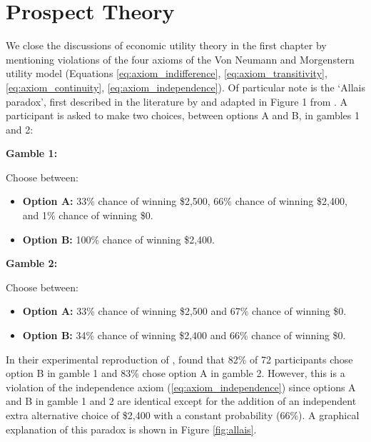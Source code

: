 \section{Prospect Theory}\label{sec:prospect}

We close the discussions of economic utility theory in the first chapter by mentioning violations of the four axioms of the Von Neumann and Morgenstern utility model (Equations \ref{eq:axiom_indifference}, \ref{eq:axiom_transitivity}, \ref{eq:axiom_continuity}, \ref{eq:axiom_independence}). Of particular note is the ‘Allais paradox’, first described in the literature by \cite{allaisComportementLHommeRationnel1953} and adapted in Figure 1 from \cite{kahnemanProspectTheoryAnalysis1979}. A participant is asked to make two choices, between options A and B, in gambles 1 and 2:

\begin{center}
\textbf{Gamble 1:}
\end{center}

Choose between:
\begin{itemize}
    \item \textbf{Option A:} 33\% chance of winning \$2,500, 66\% chance of winning \$2,400, and 1\% chance of winning \$0.
    \item \textbf{Option B:} 100\% chance of winning \$2,400.
\end{itemize}

\begin{center}
\textbf{Gamble 2:}
\end{center}

Choose between:
\begin{itemize}
    \item \textbf{Option A:} 33\% chance of winning \$2,500 and 67\% chance of winning \$0.
    \item \textbf{Option B:} 34\% chance of winning \$2,400 and 66\% chance of winning \$0.
\end{itemize}

In their experimental reproduction of \cite{allaisComportementLHommeRationnel1953}, \cite{kahnemanProspectTheoryAnalysis1979} found that 82\% of 72 participants chose option B in gamble 1 and 83\% chose option A in gamble 2. However, this is a violation of the independence axiom (\ref{eq:axiom_independence}) since options A and B in gamble 1 and 2 are identical except for the addition of an independent extra alternative choice of \$2,400 with a constant probability (66\%). A graphical explanation of this paradox is shown in Figure \ref{fig:allais}.

